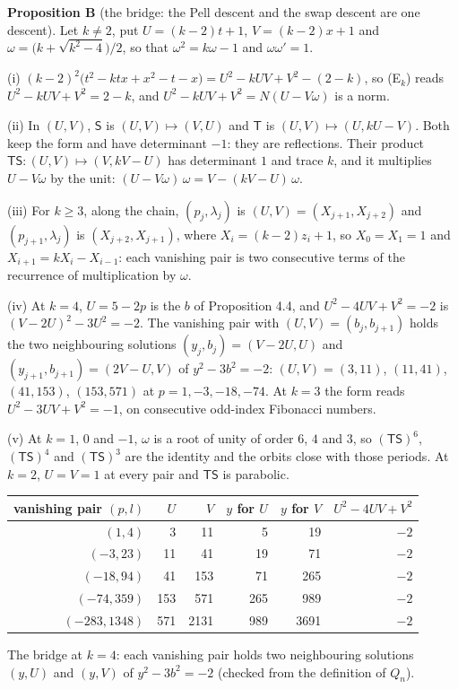 \documentclass[11pt]{article}
\begin{document}
\noindent\textbf{Proposition B} (the bridge: the Pell descent and the swap descent are one descent). Let $k\ne2$, put $U=(k-2)t+1$, $V=(k-2)x+1$ and $\omega=\bigl(k+\sqrt{k^2-4}\bigr)/2$, so that $\omega^2=k\omega-1$ and $\omega\omega'=1$.

(i) $(k-2)^2\bigl(t^2-ktx+x^2-t-x\bigr)=U^2-kUV+V^2-(2-k)$, so (E$_k$) reads $U^2-kUV+V^2=2-k$, and $U^2-kUV+V^2=N(U-V\omega)$ is a norm.

(ii) In $(U,V)$, $\mathsf{S}$ is $(U,V)\mapsto(V,U)$ and $\mathsf{T}$ is $(U,V)\mapsto(U,kU-V)$. Both keep the form and have determinant $-1$: they are reflections. Their product $\mathsf{T}\mathsf{S}:(U,V)\mapsto(V,kV-U)$ has determinant $1$ and trace $k$, and it multiplies $U-V\omega$ by the unit: $(U-V\omega)\,\omega=V-(kV-U)\,\omega$.

(iii) For $k\ge3$, along the chain, $(p_j,\lambda_j)$ is $(U,V)=(X_{j+1},X_{j+2})$ and $(p_{j+1},\lambda_j)$ is $(X_{j+2},X_{j+1})$, where $X_i=(k-2)z_i+1$, so $X_0=X_1=1$ and $X_{i+1}=kX_i-X_{i-1}$: each vanishing pair is two consecutive terms of the recurrence of multiplication by $\omega$.

(iv) At $k=4$, $U=5-2p$ is the $b$ of Proposition 4.4, and $U^2-4UV+V^2=-2$ is $(V-2U)^2-3U^2=-2$. The vanishing pair with $(U,V)=(b_j,b_{j+1})$ holds the two neighbouring solutions $(y_j,b_j)=(V-2U,U)$ and $(y_{j+1},b_{j+1})=(2V-U,V)$ of $y^2-3b^2=-2$: $(U,V)=(3,11)$, $(11,41)$, $(41,153)$, $(153,571)$ at $p=1,-3,-18,-74$. At $k=3$ the form reads $U^2-3UV+V^2=-1$, on consecutive odd-index Fibonacci numbers.

(v) At $k=1$, $0$ and $-1$, $\omega$ is a root of unity of order $6$, $4$ and $3$, so $(\mathsf{T}\mathsf{S})^6$, $(\mathsf{T}\mathsf{S})^4$ and $(\mathsf{T}\mathsf{S})^3$ are the identity and the orbits close with those periods. At $k=2$, $U=V=1$ at every pair and $\mathsf{T}\mathsf{S}$ is parabolic.

\smallskip
\begin{center}
\small
\begin{tabular}{rrrrrr}
vanishing pair $(p,l)$ & $U$ & $V$ & $y$ for $U$ & $y$ for $V$ & $U^2-4UV+V^2$\\
\hline
$(1,4)$ & 3 & 11 & 5 & 19 & $-2$\\
$(-3,23)$ & 11 & 41 & 19 & 71 & $-2$\\
$(-18,94)$ & 41 & 153 & 71 & 265 & $-2$\\
$(-74,359)$ & 153 & 571 & 265 & 989 & $-2$\\
$(-283,1348)$ & 571 & 2131 & 989 & 3691 & $-2$\\
\end{tabular}

\smallskip
The bridge at $k=4$: each vanishing pair holds two neighbouring solutions $(y,U)$ and $(y,V)$ of $y^2-3b^2=-2$ (checked from the definition of $Q_n$).
\end{center}
\end{document}
